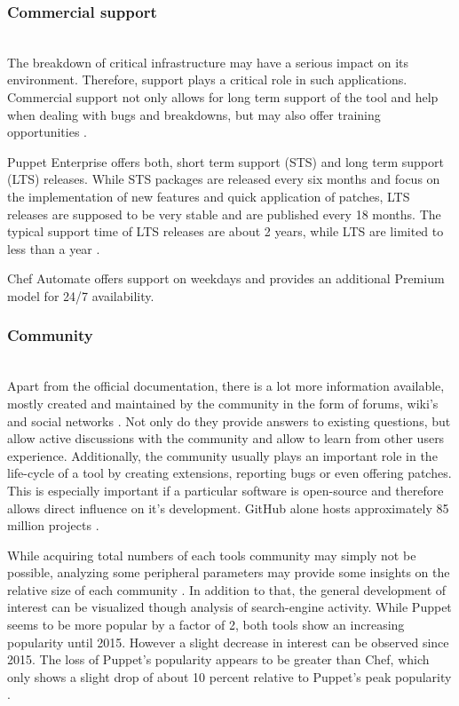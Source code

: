 \subsubsection{Commercial support}\hfill\\
The breakdown of critical infrastructure may have a serious impact on its environment. Therefore, support plays a critical role in such applications. Commercial support not only allows for long term support of the tool and help when dealing with bugs and breakdowns, but may also offer training opportunities \cite{delaet2010survey}.

Puppet Enterprise offers both, short term support (STS) and long term support (LTS) releases. While STS packages are released every six months and focus on the implementation of new features and quick application of patches, LTS releases are supposed to be very stable and are published every 18 months. The typical support time of LTS releases are about 2 years, while LTS are limited to less than a year \cite{puppetcomenterpriselifecycle}.

Chef Automate offers support on weekdays and provides an additional Premium model for 24/7 availability.

\subsubsection{Community}\hfill\\
Apart from the official documentation, there is a lot more information available, mostly created and maintained by the community in the form of forums, wiki's and social networks \cite{delaet2010survey}. Not only do they provide answers to existing questions, but allow active discussions with the community and allow to learn from other users experience. Additionally, the community usually plays an important role in the life-cycle of a tool by creating extensions, reporting bugs or even offering patches. This is especially important if a particular software is open-source and therefore allows direct influence on it's development. GitHub alone hosts approximately 85 million projects \cite{githubabout}.

While acquiring total numbers of each tools community may simply not be possible, analyzing some peripheral parameters may provide some insights on the relative size of each community \cite{pandey2012investigating}. In addition to that, the general development of interest can be visualized though analysis of search-engine activity. While Puppet seems to be more popular by a factor of 2, both tools show an increasing popularity until 2015. However a slight decrease in interest can be observed since 2015. The loss of Puppet's popularity appears to be greater than Chef, which only shows a slight drop of about 10 percent relative to Puppet's peak popularity \cite{googlepuppetvschef}.